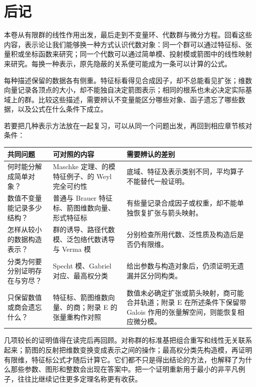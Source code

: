 \chapter*{后记}

本卷从有限群的线性作用出发，最后走到不变量环、代数群与微分方程。回看这些内容，表示论让我们能够换一种方式认识代数对象：同一个群可以通过特征标、张量积或坐标函数来研究；同一个代数可以通过简单模、投射模或箭图中的线性映射来研究。每换一种表示，原先隐蔽的关系便可能成为一条可以计算的公式。

\ProseParagraphBreak
每种描述保留的数据各有侧重。特征标看得见合成因子，却不总能看见扩张；维数向量记录各顶点的大小，却不能独自决定箭图表示；相同的根系也未必决定实际基域上的群。比较这些描述，需要辨认不变量能区分哪些对象、函子遗忘了哪些数据，以及公式在什么条件下成立。

\ProseParagraphBreak
若要把几种表示方法放在一起复习，可以从同一个问题出发，再回到相应章节核对条件：

\begin{center}
	\small
	\begin{tabularx}{\textwidth}{@{}p{}p{}X@{}}
		\toprule
		共同问题 & 可对照的内容 & 需要辨认的差别 \\
		\midrule
		何时能分解成简单对象？ & Maschke 定理、\chapref{b5:ch:08}的模特征例子、\chapref{b5:ch:18}的 Weyl 完全可约性 & 底域、特征及表示类别不同，平均算子不能替代一般证明。 \\
		数值不变量能记录多少结构？ & 普通与 Brauer 特征标、箭图维数向量、形式特征标 & 有些量记录合成因子或权重，却不能单独恢复扩张与箭头映射。 \\
		怎样从较小的数据构造表示？ & 群的诱导、路径代数模、泛包络代数诱导与 Verma 模 & 分别检查所用代数、泛性质及构造后是否仍有限维。 \\
		分类为何要分别证明存在与穷尽？ & Specht 模、Gabriel 对应、最高权分类 & 给出参数与构造对象后，仍须证明无遗漏并区分同构类。 \\
		只保留数值或商会遗忘什么？ & 特征标、箭图维数向量、\chapref{b5:ch:22}的商；附录 E 的张量重构作对照 & 数值未必确定扩张或箭头映射，商可能合并轨道；附录 E 在所述条件下保留带 Galois 作用的张量解空间，则能恢复相应微分模。 \\
		\bottomrule
	\end{tabularx}
\end{center}

\ProseParagraphBreak
几项较长的证明值得在读完后再回顾。对称群的标准基把组合重写和线性无关联系起来；箭图的反射把维数变换变成表示之间的操作；最高权分类先构造模，再证明有限维，特征标公式才随后计算它。它们都不只是得出结论的方法，也解释了为什么那些参数、图形和整数会出现在答案中。把一个证明重新用于最小的非平凡例子，往往比继续记住更多定理名称更有收获。

